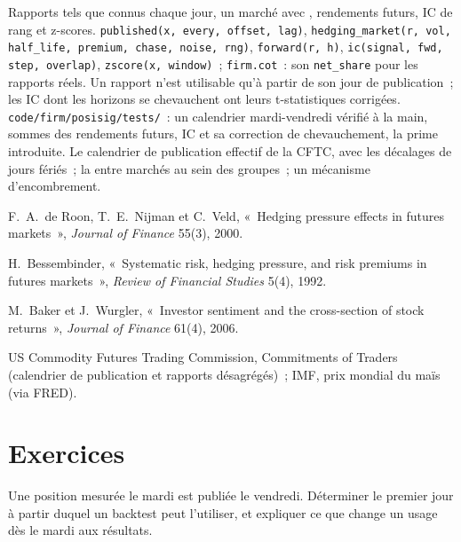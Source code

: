\begin{build}
 Rapports tels que connus chaque jour, un marché avec , rendements futurs, IC de rang et z-scores.
 \texttt{published(x, every, offset, lag)}, \texttt{hedging\_market(r, vol, half\_life, premium, chase, noise, rng)},
\texttt{forward(r, h)}, \texttt{ic(signal, fwd, step, overlap)}, \texttt{zscore(x, window)}~; \texttt{firm.cot}~: son \texttt{net\_share} pour les rapports réels.
 Un rapport n'est utilisable qu'à partir de son jour de publication~; les IC dont les horizons se chevauchent ont leurs t-statistiques corrigées.
 \texttt{code/firm/posisig/tests/}~: un calendrier mardi-vendredi vérifié à la main, sommes des rendements futurs, IC et sa correction de chevauchement, la
prime introduite.
 Le calendrier de publication effectif de la CFTC, avec les décalages de jours fériés~; la  entre marchés au sein des groupes~; un mécanisme d'encombrement.
\end{build}

\begin{omsources}
\item F.~A.~de Roon, T.~E.~Nijman et C.~Veld, «~Hedging pressure effects in futures markets~», \emph{Journal of Finance} 55(3), 2000.
\item H.~Bessembinder, «~Systematic risk, hedging pressure, and risk premiums in futures markets~», \emph{Review of Financial Studies} 5(4), 1992.
\item M.~Baker et J.~Wurgler, «~Investor sentiment and the cross-section of stock returns~», \emph{Journal of Finance} 61(4), 2006.
\item US Commodity Futures Trading Commission, Commitments of Traders (calendrier de publication et rapports désagrégés)~; IMF, prix mondial du maïs (via
FRED).
\end{omsources}

\section{Exercices}

\begin{exercise}[$\star$]\label{exo:s1:positioning-and-sentiment:1}
Une position mesurée le mardi est publiée le vendredi. Déterminer le premier jour à partir duquel un backtest peut l'utiliser, et expliquer ce que change un usage dès le mardi aux résultats.
\end{exercise}

